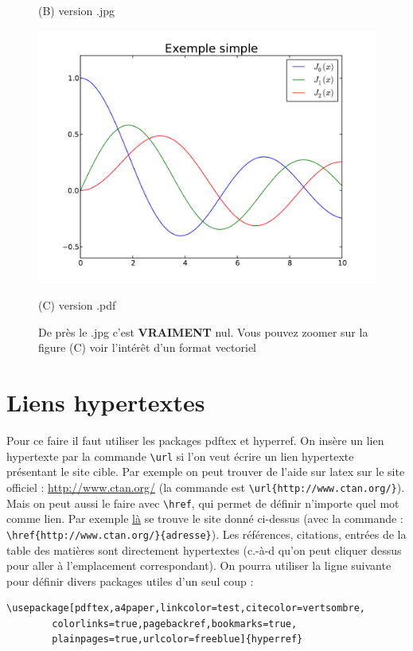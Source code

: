 \begin{figure}[htb]
\begin{minipage}[b]{.33\linewidth}
  \vspace{0.1cm}
  \centerline{(B) version .jpg}\medskip
\end{minipage}%
\hfill
\begin{minipage}[b]{.33\linewidth}
  \centering
 \centerline{\includegraphics[clip,viewport=400 300 520 450,width=1.\textwidth]{example_simple_pdf}}
  \vspace{0.1cm}
  \centerline{(C) version .pdf}\medskip
\end{minipage}%
\caption{De pr\`es le .jpg c'est \textbf{VRAIMENT} nul. Vous pouvez zoomer sur la figure (C) voir l'intérêt d'un
format vectoriel}
\label{fig:ma_figure_zoom}
\end{figure}


\section{Liens hypertextes}

Pour ce faire il faut utiliser les packages pdftex et hyperref.
On insère un lien hypertexte par la commande 
\lstinline+\url+ si l'on veut écrire un lien 
hypertexte présentant le site cible. 
Par exemple on peut trouver de l'aide sur latex sur le site officiel : 
\url{http://www.ctan.org/} (la commande est \lstinline+\url{http://www.ctan.org/}+). 
Mais on peut aussi le faire avec  \lstinline+\href+, qui permet de définir n'importe quel mot 
comme lien. 
Par exemple \href{http://www.ctan.org/}{là} se trouve le site donné ci-dessus 
(avec la commande : \lstinline+\href{http://www.ctan.org/}{adresse}+).  
Les références, citations, entrées de la table des matières sont directement hypertextes 
(c.-à-d qu'on peut cliquer dessus pour aller à l'emplacement correspondant).
On pourra utiliser la ligne suivante pour définir divers packages utiles  d'un seul coup :
\begin{lstlisting}
\usepackage[pdftex,a4paper,linkcolor=test,citecolor=vertsombre,
	    colorlinks=true,pagebackref,bookmarks=true, 
	    plainpages=true,urlcolor=freeblue]{hyperref}
\end{lstlisting}

